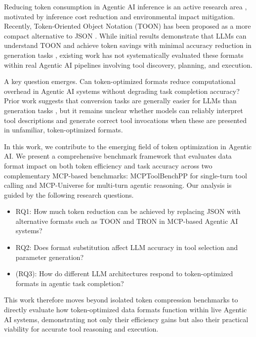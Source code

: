 \documentclass[10pt,twocolumn,letterpaper]{article}
\begin{document}
Reducing token consumption in Agentic AI inference is an active research area \citep{Yang_He_Gao_Cao_Li_Hsu_2025, Zhang_Wang_Xu_Zhang_Lyu_Chen_Liu_Xu_Zhao_Gao_et_al._2025, Han_Wang_Fang_Zhao_Ma_Chen_2025, Ro_Qiu_Goiri_Fonseca_Bianchini_Akella_Wang_Erez_Choukse_2025}, motivated by inference cost reduction and environmental impact mitigation. Recently, Token-Oriented Object Notation (TOON) has been proposed as a more compact alternative to JSON \citep{Lafalce_2025}. While initial results demonstrate that LLMs can understand TOON and achieve token savings with minimal accuracy reduction in generation tasks \citep{Masciari_Moscato_Napolitano_Orlando_Perillo_Russo_2026}, existing work has not systematically evaluated these formats within real Agentic AI pipelines involving tool discovery, planning, and execution.

A key question emerges. Can token-optimized formats reduce computational overhead in Agentic AI systems without degrading task completion accuracy? Prior work suggests that conversion tasks are generally easier for LLMs than generation tasks \citep{Masciari_Moscato_Napolitano_Orlando_Perillo_Russo_2026}, but it remains unclear whether models can reliably interpret tool descriptions and generate correct tool invocations when these are presented in unfamiliar, token-optimized formats.

In this work, we contribute to the emerging field of token optimization in Agentic AI. We present a comprehensive benchmark framework that evaluates data format impact on both token efficiency and task accuracy across two complementary MCP-based benchmarks: MCPToolBenchPP \citep{fan2025mcptoolbench} for single-turn tool calling and MCP-Universe \citep{luo2025mcpuniverse} for multi-turn agentic reasoning. Our analysis is guided by the following research questions.
\begin{itemize}
    \item RQ1: How much token reduction can be achieved by replacing JSON with alternative formats such as TOON and TRON in MCP-based Agentic AI systems?
    
    \item RQ2: Does format substitution affect LLM accuracy in tool selection and parameter generation?
    
    \item (RQ3): How do different LLM architectures respond to token-optimized formats in agentic task completion?
\end{itemize}


This work therefore moves beyond isolated token compression benchmarks to directly evaluate how token-optimized data formats function within live Agentic AI systems, demonstrating not only their efficiency gains but also their practical viability for accurate tool reasoning and execution.
\end{document}
